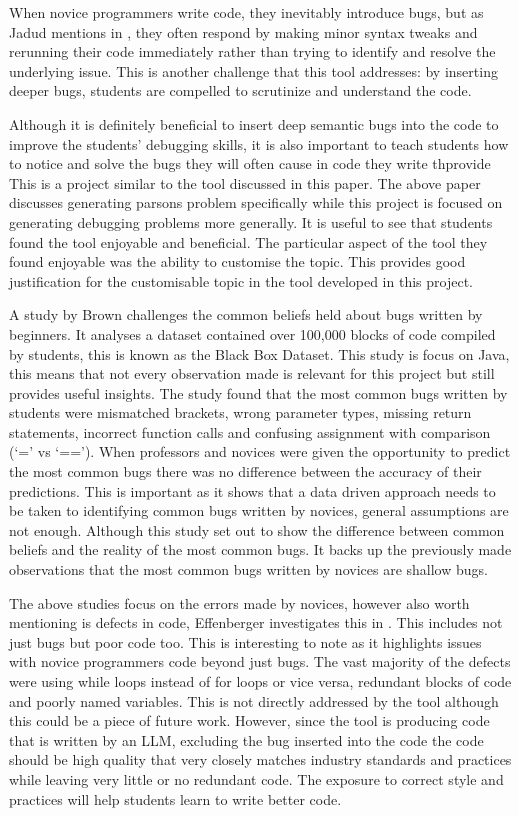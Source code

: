 \documentclass[12pt]{extarticle}
\begin{document}
When novice programmers write code, they inevitably introduce bugs, but as Jadud mentions in \cite{jadud2006}, they often respond by making minor syntax tweaks and rerunning their code immediately rather than trying to identify and resolve the underlying issue. This is another challenge that this tool addresses: by inserting deeper bugs, students are compelled to scrutinize and understand the code.

Although it is definitely beneficial to insert deep semantic bugs into the code to improve the students' debugging skills, it is also important to teach students how to notice and solve the bugs they will often cause in code they write thprovide
This is a project similar to the tool discussed in this paper. The above paper discusses generating parsons problem specifically while this project is focused on generating debugging problems more generally. It is useful to see that students found the tool enjoyable and beneficial. The particular aspect of the tool they found enjoyable was the ability to customise the topic. This provides good justification for the customisable topic in the tool developed in this project.

A study by Brown \cite{Brown2014} challenges the common beliefs held about bugs written by beginners. It analyses a dataset contained over 100,000 blocks of code compiled by students, this is known as the Black Box Dataset. This study is focus on Java, this means that not every observation made is relevant for this project but still provides useful insights. The study found that the most common bugs written by students were mismatched brackets, wrong parameter types, missing return statements, incorrect function calls and confusing assignment with comparison (`=' vs `=='). When professors and novices were given the opportunity to predict the most common bugs there was no difference between the accuracy of their predictions. This is important as it shows that a data driven approach needs to be taken to identifying common bugs written by novices, general assumptions are not enough. Although this study set out to show the difference between common beliefs and the reality of the most common bugs. It backs up the previously made observations that the most common bugs written by novices are shallow bugs.

The above studies focus on the errors made by novices, however also worth mentioning is defects in code, Effenberger investigates this in \cite{Effenberger2022}. This includes not just bugs but poor code too. This is interesting to note as it highlights issues with novice programmers code beyond just bugs. The vast majority of the defects were using while loops instead of for loops or vice versa, redundant blocks of code and poorly named variables. This is not directly addressed by the tool although this could be a piece of future work. However, since the tool is producing code that is written by an LLM, excluding the bug inserted into the code the code should be high quality that very closely matches industry standards and practices while leaving very little or no redundant code. The exposure to correct style and practices will help students learn to write better code.
\end{document}
